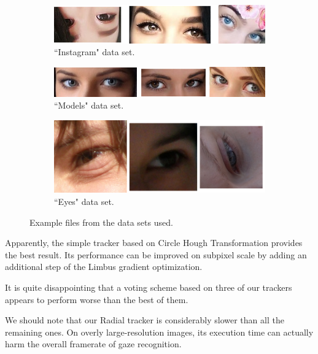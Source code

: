 \begin{figure}[t]
	\centering 
	\begin{subfigure}[b]{0.7\textwidth}
		\centering \includegraphics[width=\linewidth]{img/data-instagram.png} \caption{``Instagram" data set.} \label{i:res-data-instagram}
	\end{subfigure}
	\begin{subfigure}[b]{0.7\textwidth}
		\centering \includegraphics[width=\linewidth]{img/data-models.png} \caption{``Models" data set.} \label{i:res-data-models}
	\end{subfigure}
	\begin{subfigure}[b]{0.7\textwidth}
		\centering \includegraphics[width=\linewidth]{img/data-eyes.png} \caption{``Eyes" data set.} \label{i:res-data-eyes}
	\end{subfigure}
	\caption{Example files from the data sets used.}\label{i:res-data}
\end{figure}

Apparently, the simple tracker based on Circle Hough Transformation provides the best result.
Its performance can be improved on subpixel scale by adding an additional step of the Limbus gradient optimization.

It is quite disappointing that a voting scheme based on three of our trackers appears to perform worse than the best of them.

We should note that our Radial tracker is considerably slower than all the remaining ones.
On overly large-resolution images, its execution time can actually harm the overall framerate of gaze recognition.

